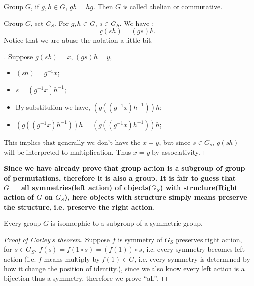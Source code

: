 \documentclass[11pt]{article}
\begin{document}
\begin{definition}
Group \(G\), if \(g, h \in G\), \(gh = hg\). Then \(G\) is called abelian or commutative.
\end{definition}

\begin{proposition}
Group \(G\), set \(G_S\). For \(g, h \in G\), \(s \in G_S\). We have :
\[
g(sh) = (gs)h.
\]
Notice that we are abuse the notation a little bit.
\end{proposition}

\begin{proof}[ ]
\leavevmode
Suppose \(g(sh) = x\), \((gs)h = y\),
\begin{itemize}
\item \((sh) = g^{-1}x\);
\item \(s = (g^{-1}x)h^{-1}\);
\item By substitution we have, \((g((g^{-1}x)h^{-1}))h\);
\item \((g((g^{-1}x)h^{-1}))h = (g((g^{-1}x)h^{-1}))h\);
\end{itemize}
This implies that generally we don't have the \(x = y\), but since \(s \in G_s\), \(g(sh)\) will be interpreted to multiplication. Thus \(x = y\) by associativity.
\end{proof}

\textbf{Since we have already prove that group action is a subgroup of group of permutations, therefore it is also a group. It is fair to guess that \(G =\) all symmetries(left action) of objects(\(G_S\)) with structure(Right action of \(G\) on \(G_S\)), here objects with structure simply means preserve the structure, i.e. preserve the right action.}

\begin{theorem}
Every group \(G\) is isomorphic to a subgroup of a symmetric group.
\end{theorem}

\begin{proof}[Proof of Carley's theorem]
\leavevmode
Suppose \(f\) is symmetry of \(G_S\) preserves right action, for \(s \in G_S\), \(f(s) = f(1\circ s) = (f(1)) \circ s\), i.e. every symmetry becomes left action (i.e. \(f\) means multiply by \(f(1) \in G\), i.e. every symmetry is determined by how it change the position of identity.), since we also know every left action is a bijection thus a symmetry, therefore we prove ``all''.
\end{proof}
\end{document}
